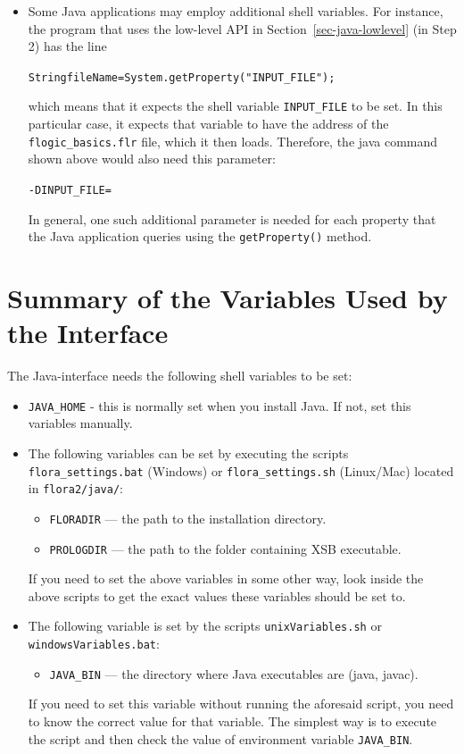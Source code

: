 \begin{itemize}
\item
Some Java applications may employ additional shell variables. For instance,
the program that uses the low-level API in
Section~\ref{sec-java-lowlevel} (in Step 2) has the line 
\begin{alltt}
      String fileName = System.getProperty("INPUT\_FILE"); 
\end{alltt}
which means that it expects the shell variable \texttt{INPUT\_FILE} to be set.
In this particular case, it expects that variable to have the address of
the \texttt{flogic\_basics.flr} \FLSYSTEM file, which it then
loads. Therefore, the java command shown above would also need this
parameter:
\begin{alltt}
      -DINPUT_FILE=%
\end{alltt}
In general, one such additional parameter is needed for each property
that the Java application queries using the \texttt{getProperty()} method. 
\end{itemize}

\section{Summary of the Variables Used by the Interface}

The Java-\FLSYSTEM interface needs the following shell variables to be
set:
\begin{itemize}
\item  \texttt{JAVA\_HOME} - this is normally set when you install Java. If
  not, set this variables manually.
\item  The following variables can be set by executing the scripts
  \texttt{flora\_settings.bat} (Windows) or \texttt{flora\_settings.sh}
  (Linux/Mac) located in \texttt{flora2/java/}: 
  \begin{itemize}
  \item  \texttt{FLORADIR} --- the path to the \FLSYSTEM installation directory.
  \item  \texttt{PROLOGDIR} --- the path to the folder containing XSB executable.
  \end{itemize}
  If you need to set the above variables in some other way, look inside the
  above scripts to get the exact values these variables should be set to.
\item The following variable is set by the scripts
  \texttt{unixVariables.sh} or \texttt{windowsVariables.bat}:
  \begin{itemize}
  \item   \texttt{JAVA\_BIN} --- the directory where Java executables are
    (java, javac).
  \end{itemize}
  If you need to set this variable without running 
  the aforesaid script, you need to know the correct value for that variable.
  The simplest way is to execute the script and then
  check the value of environment variable \texttt{JAVA\_BIN}.
\end{itemize}

